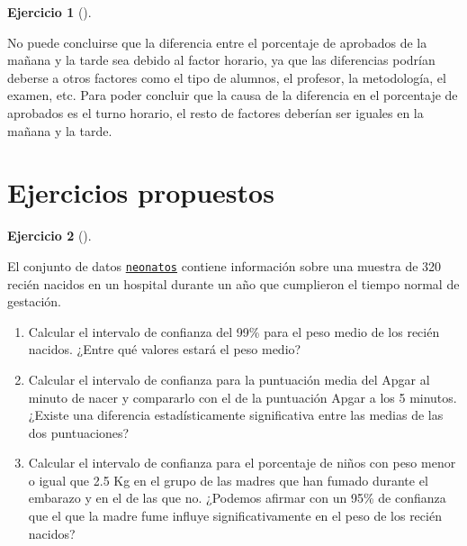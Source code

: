 \documentclass[
  a4paper,
]{scrreport}
\theoremstyle{definition}
\newtheorem{exercise}{Ejercicio}[chapter]
\theoremstyle{remark}
\begin{document}
\begin{exercise}[]
\begin{enumerate}
\begin{tcolorbox}
  No puede concluirse que la diferencia entre el porcentaje de aprobados
  de la mañana y la tarde sea debido al factor horario, ya que las
  diferencias podrían deberse a otros factores como el tipo de alumnos,
  el profesor, la metodología, el examen, etc. Para poder concluir que
  la causa de la diferencia en el porcentaje de aprobados es el turno
  horario, el resto de factores deberían ser iguales en la mañana y la
  tarde.

  \end{tcolorbox}
\end{enumerate}

\end{exercise}

\section{Ejercicios propuestos}\label{ejercicios-propuestos-5}

\begin{exercise}[]\protect\hypertarget{exr-intervalos-confianza-1-poblacion-neonatos}{}\label{exr-intervalos-confianza-1-poblacion-neonatos}

El conjunto de datos
\href{https://aprendeconalf.es/estadistica-practicas-r/datos/neonatos.csv}{\texttt{neonatos}}
contiene información sobre una muestra de 320 recién nacidos en un
hospital durante un año que cumplieron el tiempo normal de gestación.

\begin{enumerate}
\def\labelenumi{\alph{enumi}.}
\item
  Calcular el intervalo de confianza del 99\% para el peso medio de los
  recién nacidos. ¿Entre qué valores estará el peso medio?
\item
  Calcular el intervalo de confianza para la puntuación media del Apgar
  al minuto de nacer y compararlo con el de la puntuación Apgar a los 5
  minutos. ¿Existe una diferencia estadísticamente significativa entre
  las medias de las dos puntuaciones?
\item
  Calcular el intervalo de confianza para el porcentaje de niños con
  peso menor o igual que 2.5 Kg en el grupo de las madres que han fumado
  durante el embarazo y en el de las que no. ¿Podemos afirmar con un
  95\% de confianza que el que la madre fume influye significativamente
  en el peso de los recién nacidos?
\end{enumerate}

\end{exercise}
\end{document}
